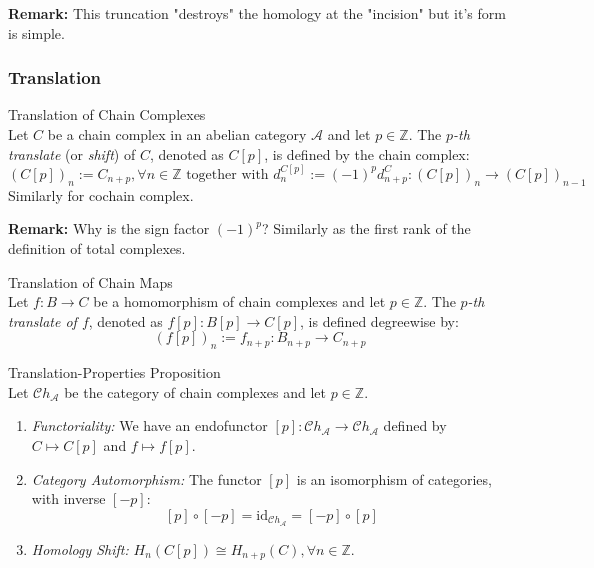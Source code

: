 \noindent\textbf{Remark:} This truncation "destroys" the homology at the "incision" but it's form is simple.

\subsubsection{Translation}

\begin{definition}{Translation of Chain Complexes}\\
Let $C$ be a chain complex in an abelian category $\mathcal{A}$ and let $p \in \mathbb{Z}$. The \textit{$p$-th translate} (or \textit{shift}) of $C$, denoted as $C[p]$, is defined by the chain complex:
\[
(C[p])_n:= C_{n+p} ,\forall n\in \mathbb{Z} \text{ together with } d_n^{C[p]} := (-1)^p d_{n+p}^C: (C[p])_n \to (C[p])_{n-1}
\]
Similarly for cochain complex.
\end{definition}

\noindent\textbf{Remark:} Why is the sign factor $(-1)^p$? Similarly as the first rank of the definition of total complexes.

\begin{definition}{Translation of Chain Maps}\\
Let $f:B\to C$ be a homomorphism of chain complexes and let $p\in \mathbb{Z}$. The \textit{$p$-th translate of $f$}, denoted as $f[p]: B[p] \to C[p]$, is defined degreewise by:
\[
(f[p])_n:= f_{n+p}: B_{n+p} \to C_{n+p}
\]
\end{definition}

\begin{proposition}{Translation-Properties Proposition}\\
Let $\mathcal{C}h_\mathcal{A}$ be the category of chain complexes and let $p\in \mathbb{Z}$.
\begin{enumerate}
    \item \textit{Functoriality:} We have an endofunctor $[p]: \mathcal{C}h_\mathcal{A} \to \mathcal{C}h_\mathcal{A}$ defined by $C\mapsto C[p]$ and $f\mapsto f[p]$.
    \item \textit{Category Automorphism:} The functor $[p]$ is an isomorphism of categories, with inverse $[-p]$:
    \[
    [p] \circ [-p] =\text{id}_{\mathcal{C}h_\mathcal{A}} =[-p]\circ [p]
    \]

    \item \textit{Homology Shift:} $H_n (C[p]) \cong H_{n+p} (C), \forall n\in \mathbb{Z}$.
\end{enumerate}
\end{proposition}






